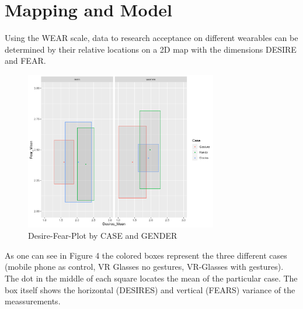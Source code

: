 \documentclass[sigchi]{acmart}
\begin{document}
\section {Mapping and Model}
Using the WEAR scale, data to research acceptance on different wearables can be determined by their relative locations on a 2D map with the dimensions DESIRE and FEAR.

\begin{figure}[h]
\includegraphics[width=84mm]{WEAR-figure.png} 
\caption{Desire-Fear-Plot by CASE and GENDER}
\end{figure}

As one can see in Figure 4 the colored boxes represent the three different cases  (mobile phone as control, VR Glasses no gestures, VR-Glasses with gestures). The dot in the middle of each square locates the mean of the particular case. The box itself shows the horizontal (DESIRES) and vertical (FEARS) variance of the meassurements.
 
\end{document}
